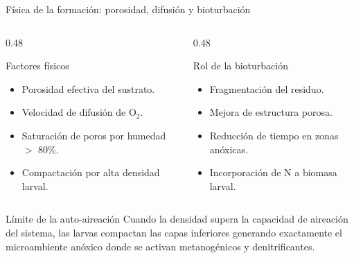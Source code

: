 \documentclass[aspectratio=169, 11pt]{beamer}
\begin{document}
\begin{frame}{F\'{i}sica de la formaci\'{o}n: porosidad, difusi\'{o}n y bioturbaci\'{o}n}
    \begin{columns}[T]
        \begin{column}{0.48\textwidth}
            \begin{block}{Factores f\'{i}sicos}
                \begin{itemize}
                    \item Porosidad efectiva del sustrato.
                    \item Velocidad de difusi\'{o}n de O$_2$.
                    \item Saturaci\'{o}n de poros por humedad $>$ 80\%.
                    \item Compactaci\'{o}n por alta densidad larval.
                \end{itemize}
            \end{block}
        \end{column}
        \begin{column}{0.48\textwidth}
            \begin{block}{Rol de la bioturbaci\'{o}n}
                \begin{itemize}
                    \item Fragmentaci\'{o}n del residuo.
                    \item Mejora de estructura porosa.
                    \item Reducci\'{o}n de tiempo en zonas an\'{o}xicas.
                    \item Incorporaci\'{o}n de N a biomasa larval.
                \end{itemize}
            \end{block}
        \end{column}
    \end{columns}

    \vfill
    \begin{alertblock}{L\'{i}mite de la auto-aireaci\'{o}n}
        \centering
        Cuando la densidad supera la capacidad de aireaci\'{o}n del sistema, las larvas compactan las capas inferiores generando exactamente el microambiente an\'{o}xico donde se activan metanog\'{e}nicos y denitrificantes.
    \end{alertblock}
\end{frame}
\end{document}
